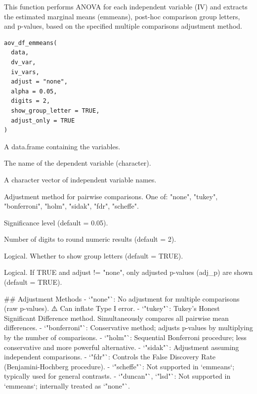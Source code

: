\documentclass[a4paper]{book}
\begin{document}
%
\begin{Description}
This function performs ANOVA for each independent variable (IV) and extracts
the estimated marginal means (emmeans), post-hoc comparison group letters, and
p-values, based on the specified multiple comparisons adjustment method.
\end{Description}
%
\begin{Usage}
\begin{verbatim}
aov_df_emmeans(
  data,
  dv_var,
  iv_vars,
  adjust = "none",
  alpha = 0.05,
  digits = 2,
  show_group_letter = TRUE,
  adjust_only = TRUE
)
\end{verbatim}
\end{Usage}
%
\begin{Arguments}
\begin{ldescription}
\item[\code{data}] A data.frame containing the variables.

\item[\code{dv\_var}] The name of the dependent variable (character).

\item[\code{iv\_vars}] A character vector of independent variable names.

\item[\code{adjust}] Adjustment method for pairwise comparisons. One of:
"none", "tukey", "bonferroni", "holm", "sidak", "fdr", "scheffe".

\item[\code{alpha}] Significance level (default = 0.05).

\item[\code{digits}] Number of digits to round numeric results (default = 2).

\item[\code{show\_group\_letter}] Logical. Whether to show group letters (default = TRUE).

\item[\code{adjust\_only}] Logical. If TRUE and adjust != "none", only adjusted p-values (adj\_p) are shown (default = TRUE).
\end{ldescription}
\end{Arguments}
%
\begin{Details}
\#\# Adjustment Methods
- `"none"`: No adjustment for multiple comparisons (raw p-values). ⚠️ Can inflate Type I error.
- `"tukey"`: Tukey's Honest Significant Difference method. Simultaneously compares all pairwise mean differences.
- `"bonferroni"`: Conservative method; adjusts p-values by multiplying by the number of comparisons.
- `"holm"`: Sequential Bonferroni procedure; less conservative and more powerful alternative.
- `"sidak"`: Adjustment assuming independent comparisons.
- `"fdr"`: Controls the False Discovery Rate (Benjamini-Hochberg procedure).
- `"scheffe"`: Not supported in `emmeans`; typically used for general contrasts.
- `"duncan"`, `"lsd"`: Not supported in `emmeans`; internally treated as `"none"`.
\end{Details}
\end{document}
